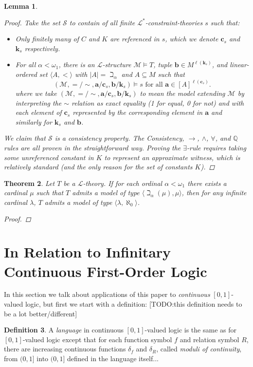 \documentclass{amsart}
\newtheorem{theorem}{Theorem}[section]
\newtheorem{lemma}[theorem]{Lemma}
\theoremstyle{definition}
\newtheorem{definition}[theorem]{Definition}
\numberwithin{equation}{theorem}
\newcommand{\Q}{\mathbb{Q}}
\newcommand{\V}{\mathbf}
\newcommand{\len}{\ell}
\newcommand{\frag}{\mathcal{L}}
\begin{document}
\begin{lemma}
\begin{proof}
    Take the set $\mathscr{S}$ to contain of all finite $\frag^*$-constraint-theories $s$ such that:
    \begin{itemize}
    \item Only finitely many of $C$ and $K$ are referenced in $s$, which we denote $\V c_s$ and $\V k_s$ respectively.
    \item For all $\alpha<\omega_1$, there is an $\frag$-structure $\mathcal M\models T$, tuple $\V b\in M^{\len(\V k_s)}$, and linear-ordered set $\langle A,<\rangle$ with $|A|=\beth_\alpha$ and $A\subseteq M$ such that 
    \[
      (\mathcal M,{=}/{\sim},\V a/\V c_s, \V b/\V k_s)\models s\text{ for all $\V a\in[A]^{\len(\V c_s)}$}.
    \]
    where we take $(\mathcal M,{=}/{\sim},\V a/\V c_s,\V b/\V k_s)$ to mean the model extending $\mathcal M$ by interpreting the $\sim$ relation as exact equality (1 for equal, 0 for not) and with each element of $\V c_s$ represented by the corresponding element in $\V a$ and similarly for $\V k_s$ and $\V b$.
    \end{itemize}
    We claim that $\mathscr{S}$ is a consistency property.
    The Consistency, $\rightarrow$, $\wedge$, $\forall$, and $\Q$ rules are all proven in the straightforward way.
    Proving the $\exists$-rule requires taking some unreferenced constant in $K$ to represent an approximate witness, which is relatively standard (and the only reason for the set of constants $K$).
    \end{proof}
  \end{lemma}
  \begin{theorem}
    Let $T$ be a $\frag$-theory.
    If for each ordinal $\alpha<\omega_1$ there exists a cardinal $\mu$ such that $T$ admits a model of type $\langle\beth_{\alpha}(\mu),\mu\rangle$, then for any infinite cardinal $\lambda$, $T$ admits a model of type $\langle\lambda,\aleph_0\rangle$.
    \begin{proof}
      
    \end{proof}
  \end{theorem}
\section{In Relation to Infinitary Continuous First-Order Logic}

In this section we talk about applications of this paper to \emph{continuous} $[0,1]$-valued logic, but first we start with a definition:
[TODO:this definition needs to be a lot better/different]
\begin{definition}
  A \emph{language} in continuous $[0,1]$-valued logic is the same as for $[0,1]$-valued logic except that for each function symbol $f$ and relation symbol $R$, there are increasing continuous functions $\delta_f$ and $\delta_R$, called \emph{moduli of continuity}, from $(0,1]$ into $(0,1]$ defined in the language itself...
\end{definition}
\end{document}
